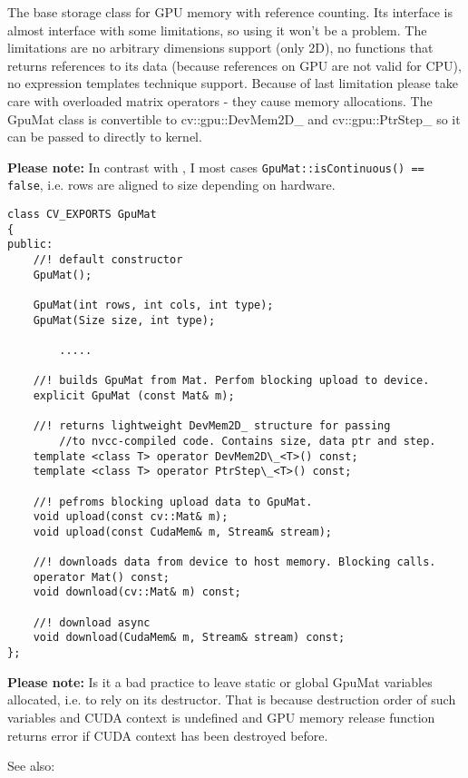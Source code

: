 
The base storage class for GPU memory with reference counting. Its interface is almost  interface with some limitations, so using it won't be a problem. The limitations are no arbitrary dimensions support (only 2D), no functions that returns references to its data (because references on GPU are not valid for CPU), no expression templates technique support. Because of last limitation please take care with overloaded matrix operators - they cause memory allocations. The GpuMat class is convertible to cv::gpu::DevMem2D\_ and cv::gpu::PtrStep\_ so it can be passed to directly to kernel.

\textbf{Please note:} In contrast with , I most cases \texttt{GpuMat::isContinuous() == false}, i.e. rows are aligned to size depending on hardware.

\begin{lstlisting}
class CV_EXPORTS GpuMat
{
public:
	//! default constructor
	GpuMat();

	GpuMat(int rows, int cols, int type);
	GpuMat(Size size, int type);

        .....

	//! builds GpuMat from Mat. Perfom blocking upload to device.
	explicit GpuMat (const Mat& m);

	//! returns lightweight DevMem2D_ structure for passing 
        //to nvcc-compiled code. Contains size, data ptr and step.
	template <class T> operator DevMem2D\_<T>() const;
	template <class T> operator PtrStep\_<T>() const;

	//! pefroms blocking upload data to GpuMat.
	void upload(const cv::Mat& m);
	void upload(const CudaMem& m, Stream& stream);

	//! downloads data from device to host memory. Blocking calls.
	operator Mat() const;
	void download(cv::Mat& m) const;

	//! download async
	void download(CudaMem& m, Stream& stream) const;
};
\end{lstlisting}

\textbf{Please note:} Is it a bad practice to leave static or global GpuMat variables allocated, i.e. to rely on its destructor. That is because destruction order of such variables and CUDA context is undefined and GPU memory release function returns error if CUDA context has been destroyed before.


See also: 


